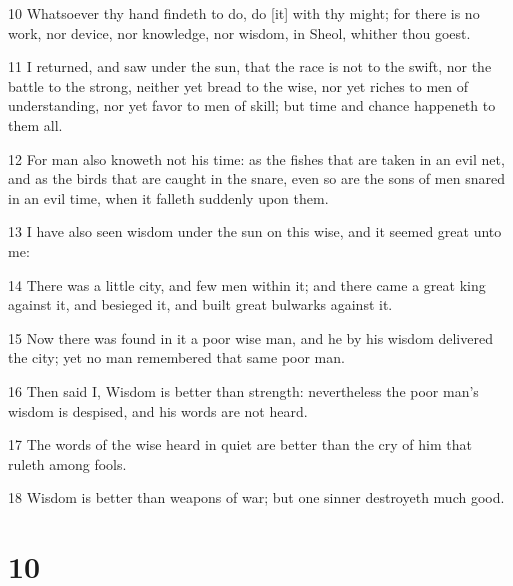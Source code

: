 \par 10 Whatsoever thy hand findeth to do, do [it] with thy might; for there is no work, nor device, nor knowledge, nor wisdom, in Sheol, whither thou goest.
\par 11 I returned, and saw under the sun, that the race is not to the swift, nor the battle to the strong, neither yet bread to the wise, nor yet riches to men of understanding, nor yet favor to men of skill; but time and chance happeneth to them all.
\par 12 For man also knoweth not his time: as the fishes that are taken in an evil net, and as the birds that are caught in the snare, even so are the sons of men snared in an evil time, when it falleth suddenly upon them.
\par 13 I have also seen wisdom under the sun on this wise, and it seemed great unto me:
\par 14 There was a little city, and few men within it; and there came a great king against it, and besieged it, and built great bulwarks against it.
\par 15 Now there was found in it a poor wise man, and he by his wisdom delivered the city; yet no man remembered that same poor man.
\par 16 Then said I, Wisdom is better than strength: nevertheless the poor man's wisdom is despised, and his words are not heard.
\par 17 The words of the wise heard in quiet are better than the cry of him that ruleth among fools.
\par 18 Wisdom is better than weapons of war; but one sinner destroyeth much good.

\chapter{10}

